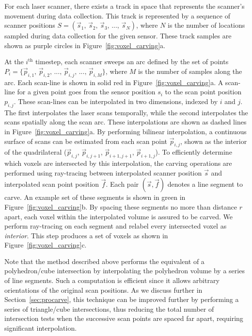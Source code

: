 \documentclass[12pt,onecolumn,oneside]{book}
\begin{document}
For each laser scanner, there exists a track in space that represents the scanner's movement during data collection.  This track is represented by a sequence of scanner positions $S = (\vec{s}_{1},\,\vec{s}_{2},\,\vec{s}_{3},\,...,\,\vec{s}_{N})$, where $N$ is the number of locations sampled during data collection for the given sensor.  These track samples are shown as purple circles in Figure~\ref{fig:voxel_carving}a.

At the $i^{\text{th}}$ timestep, each scanner sweeps an arc defined by the set of points $P_{i} = \{\vec{p}_{i,1},\,\vec{p}_{i,2},\,...,\,\vec{p}_{i,j},\,...,\,\vec{p}_{i,M}\}$, where $M$ is the number of samples along the arc.  Each scan-line is shown in solid red in Figure~\ref{fig:voxel_carving}a.  A scan-line for a given point goes from the sensor position $s_i$ to the scan point position $p_{i,j}$.  These scan-lines can be interpolated in two dimensions, indexed by $i$ and $j$.  The first interpolates the laser scans temporally, while the second interpolates the scans spatially along the scan arc.  These interpolations are shown as dashed lines in Figure~\ref{fig:voxel_carving}a.  By performing bilinear interpolation, a continuous surface of scans can be estimated from each scan point $\vec{p}_{i,j}$, shown as the interior of the quadrilateral ($\vec{p}_{i,j}$, $\vec{p}_{i,j+1}$, $\vec{p}_{i+1,j+1}$, $\vec{p}_{i+1,j}$).  To efficiently determine which voxels are intersected by this interpolation, the carving operations are performed using ray-tracing between interpolated scanner position $\vec{s}$ and interpolated scan point position $\vec{f}$.  Each pair $(\vec{s}, \vec{f})$ denotes a line segment to carve.  An example set of these segments is shown in green in Figure~\ref{fig:voxel_carving}b.  By spacing these segments no more than distance $r$ apart, each voxel within the interpolated volume is assured to be carved.  We perform ray-tracing on each segment and relabel every intersected voxel as {\it interior}.  This step produces a set of voxels as shown in Figure~\ref{fig:voxel_carving}c.

Note that the method described above performs the equivalent of a polyhedron/cube intersection by interpolating the polyhedron volume by a series of line segments.  Such a computation is efficient since it allows arbitrary orientations of the original scan positions.  As we discuss further in Section~\ref{sec:procarve}, this technique can be improved further by performing a series of triangle/cube intersections, thus reducing the total number of intersection tests when the successive scan points are spaced far apart, requiring significant interpolation.
\end{document}
